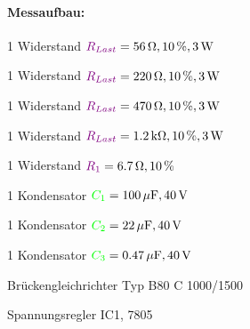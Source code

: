 \documentclass[11pt,a4paper,titlepage]{scrreprt}
\begin{document}
            \paragraph{Messaufbau:}
            \begin{itemize*}
                \item 1 Widerstand $\textcolor{violet}{R_{Last}} = \SI{56}{\ohm}, 10\,\%, \SI{3}{\watt}$
                \item 1 Widerstand $\textcolor{violet}{R_{Last}} = \SI{220}{\ohm}, 10\,\%, \SI{3}{\watt}$
                \item 1 Widerstand $\textcolor{violet}{R_{Last}} = \SI{470}{\ohm}, 10\,\%, \SI{3}{\watt}$
                \item 1 Widerstand $\textcolor{violet}{R_{Last}} = \SI{1,2}{\kilo\ohm}, 10\,\%, \SI{3}{\watt}$
                \item 1 Widerstand $\textcolor{violet}{R_1} = \SI{6,7}{\ohm}, 10\,\%$
                \item 1 Kondensator $\textcolor{green}{C_1} = \SI{100}{\mu\farad}, \SI{40}{\volt}$
                \item 1 Kondensator $\textcolor{green}{C_2} = \SI{22}{\mu\farad}, \SI{40}{\volt}$
                \item 1 Kondensator $\textcolor{green}{C_3} = \SI{0,47}{\mu\farad}, \SI{40}{\volt}$
                \item Brückengleichrichter Typ B80 C 1000/1500
                \item Spannungsregler IC1, 7805
            \end{itemize*}
\end{document}

